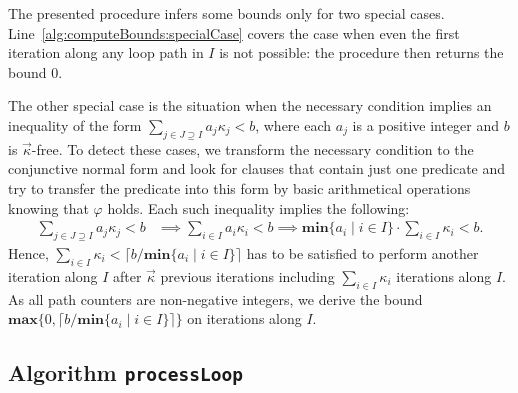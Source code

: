 \documentclass[10pt,a4paper]{article}
\newcommand{\maxim}{\ensuremath{\mathbf{max}}}
\newcommand{\minim}{\ensuremath{\mathbf{min}}}
\begin{document}
The presented procedure infers some bounds only for two special cases.
Line~\ref{alg:computeBounds:specialCase} covers the case when even the first
iteration along any loop path in $I$ is not possible: the procedure then
returns the bound $0$.

The other special case is the situation when the necessary condition
implies an inequality of the form $\sum_{j\in J\supseteq I}a_j\kappa_j<b$,
where each $a_j$ is a positive integer and $b$ is $\vec{\kappa}$-free. To
detect these cases, we transform the necessary condition to the conjunctive
normal form and look for clauses that contain just one predicate and try to 
transfer the predicate into this form by basic arithmetical
operations knowing that $\varphi$ holds. Each such inequality implies the following:
\begin{align*}
\sum_{j\in J\supseteq I}a_j\kappa_j<b &\implies \sum_{i\in I}a_i\kappa_i<b
    \implies  \minim\{a_i\mid i\in I\}\cdot\sum_{i\in I}\kappa_i<b.
\end{align*}
Hence, $\sum_{i \in I}\kappa_i<\lceil b/\minim\{a_i\mid i\in I\}\rceil$ has
to be satisfied to perform another iteration along $I$ after $\vec{\kappa}$
previous iterations including $\sum_{i \in I}\kappa_i$ iterations along
$I$. As all path counters are non-negative integers, we derive the bound
$\maxim\{0,\lceil b/\minim\{a_i\mid i\in I\}\rceil\}$ on iterations along
$I$.



\subsection{Algorithm \Large \texttt{processLoop}}\label{ssec:processLoop}
\end{document}
